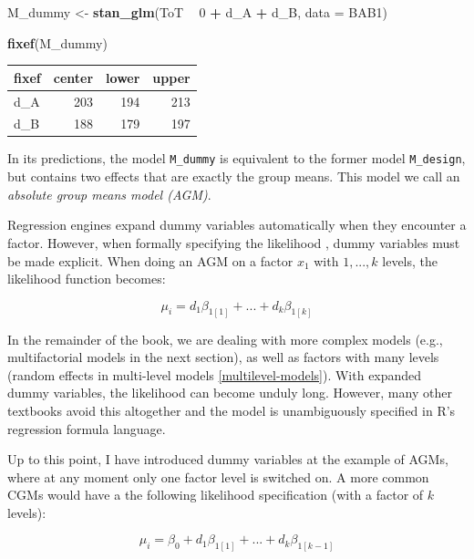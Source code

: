 \documentclass[]{svmono}
\newenvironment{Shaded}{\begin{snugshade}}{\end{snugshade}}
\newcommand{\KeywordTok}[1]{\textcolor[rgb]{0.13,0.29,0.53}{\textbf{#1}}}
\newcommand{\DataTypeTok}[1]{\textcolor[rgb]{0.13,0.29,0.53}{#1}}
\newcommand{\DecValTok}[1]{\textcolor[rgb]{0.00,0.00,0.81}{#1}}
\newcommand{\StringTok}[1]{\textcolor[rgb]{0.31,0.60,0.02}{#1}}
\newcommand{\OperatorTok}[1]{\textcolor[rgb]{0.81,0.36,0.00}{\textbf{#1}}}
\newcommand{\NormalTok}[1]{#1}
\begin{document}
\begin{Shaded}
\begin{Highlighting}[]
\NormalTok{M_dummy <-}
\StringTok{  }\KeywordTok{stan_glm}\NormalTok{(ToT }\OperatorTok{~}\StringTok{ }\DecValTok{0} \OperatorTok{+}\StringTok{ }\NormalTok{d_A }\OperatorTok{+}\StringTok{ }\NormalTok{d_B, }
     \DataTypeTok{data =}\NormalTok{ BAB1)}
\end{Highlighting}
\end{Shaded}

\begin{Shaded}
\begin{Highlighting}[]
\KeywordTok{fixef}\NormalTok{(M_dummy)}
\end{Highlighting}
\end{Shaded}

\begin{longtable}[]{@{}lrrr@{}}
\toprule
fixef & center & lower & upper\tabularnewline
\midrule
\endhead
d\_A & 203 & 194 & 213\tabularnewline
d\_B & 188 & 179 & 197\tabularnewline
\bottomrule
\end{longtable}

In its predictions, the model \texttt{M\_dummy} is equivalent to the
former model \texttt{M\_design}, but contains two effects that are
exactly the group means. This model we call an \emph{absolute group
means model (AGM)}.

Regression engines expand dummy variables automatically when they
encounter a factor. However, when formally specifying the likelihood ,
dummy variables must be made explicit. When doing an AGM on a factor
\(x_1\) with \(1,...,k\) levels, the likelihood function becomes:

\[\mu_i=d_1 \beta_{1[1]}+...+d_k \beta_{1[k]}\]

In the remainder of the book, we are dealing with more complex models
(e.g., multifactorial models in the next section), as well as factors
with many levels (random effects in multi-level models
\ref{multilevel-models}). With expanded dummy variables, the likelihood
can become unduly long. However, many other textbooks avoid this
altogether and the model is unambiguously specified in R's regression
formula language.

Up to this point, I have introduced dummy variables at the example of
AGMs, where at any moment only one factor level is switched on. A more
common CGMs would have a the following likelihood specification (with a
factor of \(k\) levels):

\[\mu_i = \beta_0 + d_1 \beta_{1[1]}+...+d_k \beta_{1[k-1]}\]
\end{document}
